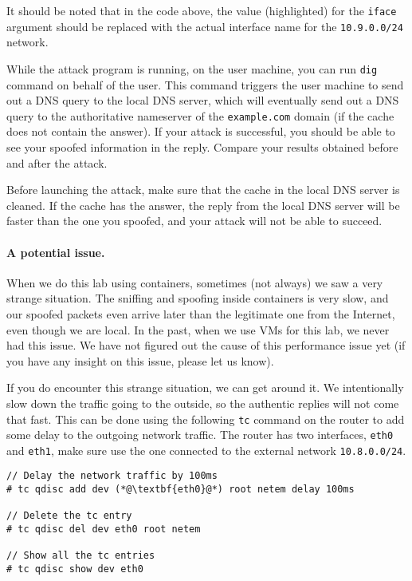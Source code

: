 It should be noted that in the code above, the value (highlighted) for the 
\texttt{iface} argument should be replaced with the actual interface 
name for the \texttt{10.9.0.0/24} network.  
 
While the attack program is running, on the user machine, you can
run \texttt{dig} command on behalf of the user.
This command triggers the user
machine to send out a DNS query to the local DNS server, which will
eventually send out a DNS query to the authoritative nameserver of the
\texttt{example.com} domain (if the cache does not contain the answer).
If your attack is successful, you should be able to see
your spoofed information in the reply. Compare your results obtained before
and after the attack. 

Before launching the attack, make sure that the cache in the local DNS
server is cleaned. If the cache has the answer, the reply from the 
local DNS server will be faster than the one you spoofed, and your 
attack will not be able to succeed. 





\paragraph{A potential issue.} When we do this lab using containers, 
sometimes (not always) we saw a very strange situation. The sniffing and spoofing 
inside containers is very slow, and our spoofed packets even arrive 
later than the legitimate one from the Internet, even though 
we are local. In the past, when we use VMs for this lab, we never 
had this issue. We have not figured out the cause of this 
performance issue yet (if you have any insight on this issue, please 
let us know). 

If you do encounter this strange situation, we can get 
around it. We intentionally slow down the 
traffic going to the outside, so the authentic replies will not 
come that fast. This can be done using the 
following \texttt{tc} command on the router to add some 
delay to the outgoing network traffic. 
The router has two interfaces, \texttt{eth0} and 
\texttt{eth1}, make sure use the one connected 
to the external network \texttt{10.8.0.0/24}.

\begin{lstlisting}
// Delay the network traffic by 100ms
# tc qdisc add dev (*@\textbf{eth0}@*) root netem delay 100ms

// Delete the tc entry
# tc qdisc del dev eth0 root netem

// Show all the tc entries 
# tc qdisc show dev eth0
\end{lstlisting}
 

